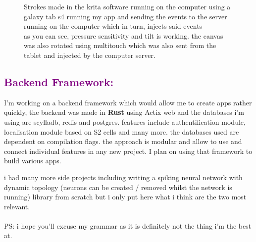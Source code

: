 \documentclass[a4paper,10pt]{article}
\begin{document}
\begin{spacing}{1}
	\begin{figure}[h!]
		\noindent{}
		\caption{Strokes made in the krita software running on the computer using a galaxy tab s4 running my app and sending the events to the server running on the computer which in turn, injects said events\\
		as you can see, pressure sensitivity and tilt is working.
		the canvas was also rotated using multitouch which was also sent from the tablet and injected by the computer server.
		}
	\end{figure}


\subsection*{\textcolor{purple}{Backend Framework:}}
	I'm working on a backend framework which would allow me to create apps rather quickly, the backend was made in \textbf{Rust} using Actix web and the databases i'm using are scylladb, redis and postgres.
features include authentification module, localisation module based on S2 cells and many more.
the databases used are dependent on compilation flags.
the approach is modular and allow to use and connect individual features in any new project.
I plan on using that framework to build various apps.

i had many more side projects including writing a spiking neural network with dynamic topology (neurons can be created / removed whilst the network is running) library from scratch
but i only put here what i think are the two most relevant.\\
\\
PS: i hope you'll excuse my grammar as it is definitely not the thing i'm the best at.

\end{spacing}
\end{document}
